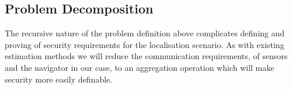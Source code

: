 \documentclass[10pt,journal,compsoc]{IEEEtran}
\theoremstyle{definition}
\theoremstyle{definition}
\theoremstyle{remark}
\begin{document}
% 
% 

\subsection{Problem Decomposition} \label{subsec:problem_decomposition}
The recursive nature of the problem definition above complicates defining and proving of security requirements for the localisation scenario. As with existing estimation methods \cite{benhamoudaNewFrameworkPrivacyPreserving2016,alexandruEncryptedCooperativeControl2019} we will reduce the communication requirements, of sensors and the navigator in our case, to an aggregation operation which will make security more easily definable. 
\end{document}
